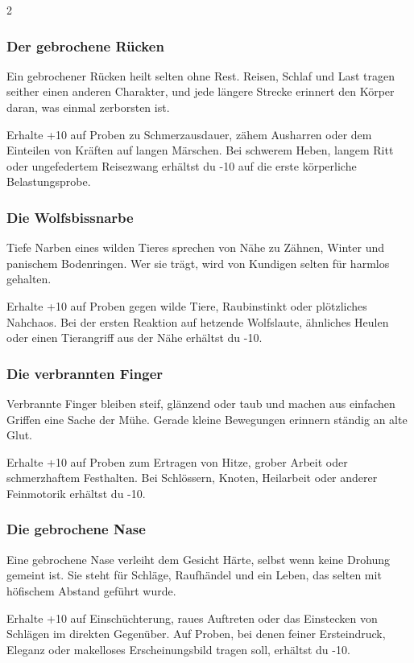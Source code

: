 {\begin{multicols*}{2}
        \subsubsection*{Der gebrochene Rücken}
        Ein gebrochener Rücken heilt selten ohne Rest. Reisen, Schlaf und Last tragen seither einen anderen Charakter, und jede längere Strecke erinnert den Körper daran, was einmal zerborsten ist.

        \malspielwertebox
        {Erhalte +10 auf Proben zu Schmerzausdauer, zähem Ausharren oder dem Einteilen von Kräften auf langen Märschen.}
        {Bei schwerem Heben, langem Ritt oder ungefedertem Reisezwang erhältst du -10 auf die erste körperliche Belastungsprobe.}

        \subsubsection*{Die Wolfsbissnarbe}
        Tiefe Narben eines wilden Tieres sprechen von Nähe zu Zähnen, Winter und panischem Bodenringen. Wer sie trägt, wird von Kundigen selten für harmlos gehalten.

        \malspielwertebox
        {Erhalte +10 auf Proben gegen wilde Tiere, Raubinstinkt oder plötzliches Nahchaos.}
        {Bei der ersten Reaktion auf hetzende Wolfslaute, ähnliches Heulen oder einen Tierangriff aus der Nähe erhältst du -10.}

        \subsubsection*{Die verbrannten Finger}
        Verbrannte Finger bleiben steif, glänzend oder taub und machen aus einfachen Griffen eine Sache der Mühe. Gerade kleine Bewegungen erinnern ständig an alte Glut.

        \malspielwertebox
        {Erhalte +10 auf Proben zum Ertragen von Hitze, grober Arbeit oder schmerzhaftem Festhalten.}
        {Bei Schlössern, Knoten, Heilarbeit oder anderer Feinmotorik erhältst du -10.}

        \subsubsection*{Die gebrochene Nase}
        Eine gebrochene Nase verleiht dem Gesicht Härte, selbst wenn keine Drohung gemeint ist. Sie steht für Schläge, Raufhändel und ein Leben, das selten mit höfischem Abstand geführt wurde.

        \malspielwertebox
        {Erhalte +10 auf Einschüchterung, raues Auftreten oder das Einstecken von Schlägen im direkten Gegenüber.}
        {Auf Proben, bei denen feiner Ersteindruck, Eleganz oder makelloses Erscheinungsbild tragen soll, erhältst du -10.}


\end{multicols*}}
